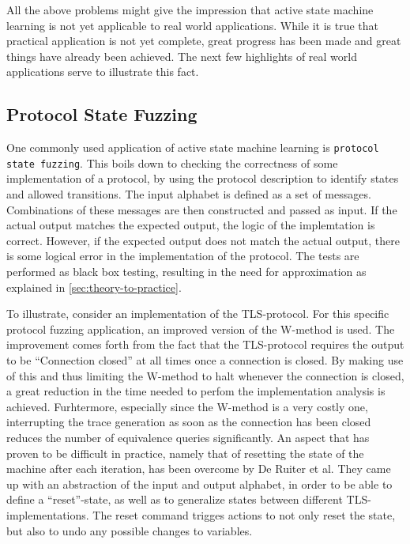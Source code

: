 \documentclass[multi,crop=false,class=article]{standalone}
\begin{document}

All the above problems might give the impression that active state machine
learning is not yet applicable to real world applications. While it is true that
practical application is not yet complete, great progress has been made and
great things have already been achieved. The next few highlights of real world
applications serve to illustrate this fact.


\subsection{Protocol State Fuzzing}
One commonly used application of active state machine learning is
\texttt{protocol state fuzzing}\cite{deRuiter15,Aarts13,Cho10,Aarts10}. This
boils down to checking the correctness of some implementation of a protocol, by
using the protocol description to identify states and allowed transitions. The
input alphabet is defined as a set of messages. Combinations of these messages
are then constructed and passed as input. If the actual output matches the 
expected output, the logic of the implemtation is correct. However, if the 
expected output does not match the actual output, there is some logical error
in the implementation of the protocol. The tests are performed as black box
testing, resulting in the need for approximation as explained in
\ref{sec:theory-to-practice}.

To illustrate, consider an implementation of the TLS-protocol\cite{deRuiter15}.
For this specific protocol fuzzing application, an improved version of the 
W-method\cite{Chow78} is used. The improvement comes forth from the fact that 
the TLS-protocol requires the output to be ``Connection closed'' at all times
once a connection is closed. By making use of this and thus limiting the
W-method to halt whenever the connection is closed, a great reduction in the
time needed to perfom the implementation analysis is achieved. Furhtermore, 
especially since the W-method is a very costly one, interrupting the trace 
generation as soon as the connection has been closed reduces the number of 
equivalence queries significantly.
An aspect that has proven to be difficult in practice, namely that of resetting
the state of the machine after each iteration, has been overcome by De Ruiter
et al. They came up with an abstraction of the input and output alphabet, in
order to be able to define a ``reset''-state, as well as to generalize states 
between different TLS-implementations. The reset command trigges actions to
not only reset the state, but also to undo any possible changes to variables.
\end{document}
